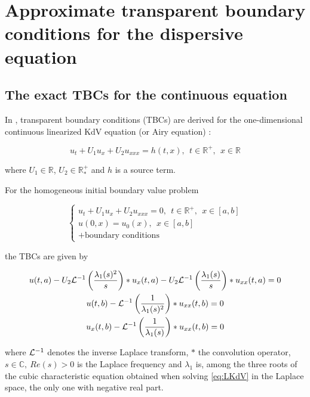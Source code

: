 \section{Approximate transparent boundary conditions for the dispersive equation}
\label{sec:TBC}

\subsection{The exact TBCs for the continuous equation}

\indent In \cite{besse2015}, transparent boundary conditions (TBCs) are derived for the one-dimensional continuous linearized KdV equation (or Airy equation) :

\begin{equation}
 	\label{eq:LKdV}
 	u_t + U_1u_x + U_2u_{xxx} = h(t,x), \ \ t \in \mathbb{R}^+, \ \ x \in \mathbb{R}
\end{equation}

\noindent where $U_1 \in \mathbb{R}$, $U_2 \in \mathbb{R}^+_*$ and $h$ is a source term.

\indent For the homogeneous initial boundary value problem 

\begin{equation*}
\begin{cases}
	u_t + U_1u_x + U_2u_{xxx} = 0, \ \ t \in \mathbb{R}^+, \ \ x \in [a,b] \\
	u(0,x) = u_0(x), \ \ x \in [a,b] \\
	+ \text{boundary conditions} \nonumber
\end{cases}
\end{equation*}

\noindent the TBCs are given \cite[equations (2.17) -(2.18)]{besse2015} by 

\begin{equation}
\label{eq:continuousTBC}
\begin{gathered}
        u(t,a) - U_2 \mathcal{L}^{-1} \left( \frac{\lambda_1(s)^2}{s} \right) * u_x(t,a) - U_2 \mathcal{L}^{-1} \left( \frac{\lambda_1(s)}{s} \right) * u_{xx}(t,a) = 0 \\ 
        u(t,b) - \mathcal{L}^{-1} \left( \frac{1}{\lambda_1(s)^2} \right) * u_{xx}(t,b) = 0 \\
        u_x(t,b) - \mathcal{L}^{-1} \left( \frac{1}{\lambda_1(s)} \right) * u_{xx}(t,b) = 0 
\end{gathered}
\end{equation}

\noindent where $\mathcal{L}^{-1}$ denotes the inverse Laplace transform, $*$ the convolution operator, $s \in \mathbb{C}, \ Re(s)>0$ is the Laplace frequency and $\lambda_1$ is, among the three roots of the cubic characteristic equation obtained when solving \eqref{eq:LKdV} in the Laplace space, the only one with negative real part.

